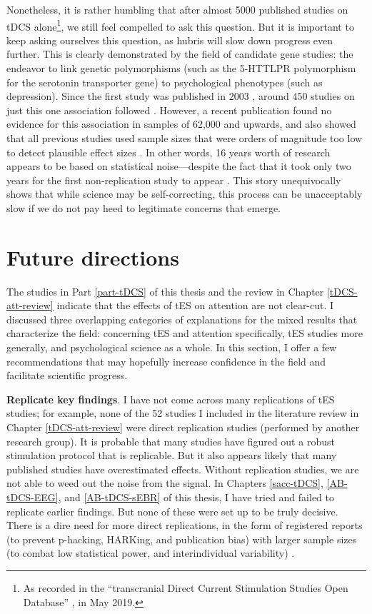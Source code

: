 \documentclass[11pt,]{memoir}
\let\rmarkdownfootnote\footnote%
\def\footnote{\protect\rmarkdownfootnote}
\begin{document}
Nonetheless, it is rather humbling that after almost 5000 published studies on tDCS alone\footnote{As recorded in the ``transcranial Direct Current Stimulation Studies Open Database'' \autocite[\url{http://tdcsdatabase.com};][]{Grossman2018}, in May 2019.}, we still feel compelled to ask this question. But it is important to keep asking ourselves this question, as hubris will slow down progress even further. This is clearly demonstrated by the field of candidate gene studies: the endeavor to link genetic polymorphisms (such as the 5-HTTLPR polymorphism for the serotonin transporter gene) to psychological phenotypes (such as depression). Since the first study was published in 2003 \autocite{Caspi2003}, around 450 studies on just this one association followed \autocite{Border2019}. However, a recent publication found no evidence for this association in samples of 62,000 and upwards, and also showed that all previous studies used sample sizes that were orders of magnitude too low to detect plausible effect sizes \autocite{Border2019}. In other words, 16 years worth of research appears to be based on statistical noise---despite the fact that it took only two years for the first non-replication study \autocite{Gillespie2005} to appear \autocite{Rieckmann2009}. This story unequivocally shows that while science may be self-correcting, this process can be unacceptably slow if we do not pay heed to legitimate concerns that emerge.

\hypertarget{discussion-future}{%
\section{Future directions}\label{discussion-future}}

The studies in Part \ref{part-tDCS} of this thesis and the review in Chapter \ref{tDCS-att-review} indicate that the effects of tES on attention are not clear-cut. I discussed three overlapping categories of explanations for the mixed results that characterize the field: concerning tES and attention specifically, tES studies more generally, and psychological science as a whole. In this section, I offer a few recommendations that may hopefully increase confidence in the field and facilitate scientific progress.

\textbf{Replicate key findings}. I have not come across many replications of tES studies; for example, none of the 52 studies I included in the literature review in Chapter \ref{tDCS-att-review} were direct replication studies (performed by another research group). It is probable that many studies have figured out a robust stimulation protocol that is replicable. But it also appears likely that many published studies have overestimated effects. Without replication studies, we are not able to weed out the noise from the signal. In Chapters \ref{sacc-tDCS}, \ref{AB-tDCS-EEG}, and \ref{AB-tDCS-sEBR} of this thesis, I have tried and failed to replicate earlier findings. But none of these were set up to be truly decisive. There is a dire need for more direct replications, in the form of registered reports (to prevent p-hacking, HARKing, and publication bias) with larger sample sizes (to combat low statistical power, and interindividual variability) \autocite[e.g.][]{Boayue2019}.
\end{document}
